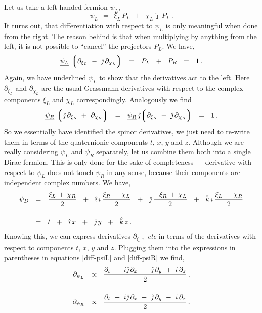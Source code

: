 \documentclass[epsfig,12pt]{article}
\newcommand{\p}{\partial}
\newcommand{\lgr}{\left\lgroup}
\newcommand{\rgr}{\right\rgroup}
\newcommand{\ii}{\hat\imath}
\newcommand{\jj}{\hat\jmath}
\newcommand{\kk}{\hat k}
\begin{document}
	Let us take a left-handed fermion $ \psi_L $,
\begin{equation}
	\psi_L	~~=~~	\xi_L\,P_L  ~~+~~  \chi_L\,\jj\,P_L\,.
\end{equation}
	It turns out, that differentiation with respect to $ \psi_L $ is only
	meaningful when done from the right.
	The reason behind is that when multiplying by anything from the left, it is 
	not possible to ``cancel'' the projectors $ P_L $.
	We have,
\begin{equation}
\label{diff-psiL}
	\underline{\psi_L}\, \lgr \p_{\xi_L} ~-~ \jj\, \p_{\chi_L} \rgr
	~~=~~
	P_L  ~~+~~  P_R
	~~=~~
	1\,.
\end{equation}
	Again, we have underlined $ \psi_L $ to show that the derivatives act to the left.
	Here $ \p_{\xi_L} $ and $ \p_{\chi_L} $ are the usual Grassmann derivatives with respect to
	the complex components $ \xi_L $ and $ \chi_L $ correspondingly.
	Analogously we find
\begin{equation}
\label{diff-psiR}
	\underline{\psi_R}\, \lgr \jj\, \p_{\xi_R} ~+~ \p_{\chi_R} \rgr	~~=~~
	\underline{\psi_R}\, \jj\! \lgr \p_{\xi_R} ~-~ \jj\, \p_{\chi_R} \rgr	~~=~~
	1\,.
\end{equation}
	So we essentially have identified the spinor derivatives, we just need to re-write them
	in terms of the quaternionic components $ t $, $ x $, $ y $ and $ z $.
	Although we are really considering $ \psi_L $ and $ \psi_R $ separately,
	let us combine them both into a single Dirac fermion.
	This is only done for the sake of completeness --- derivative with respect to $ \psi_L $
	does not touch $ \psi_R $ in any sense, 
	because their components are independent complex numbers.
	We have,
\begin{align}
%
\notag
	\psi_D	& ~~=~~
	\frac{ \xi_L \,+\, \chi_R } 2  ~~+~~
	\ii\, i\,\frac{\xi_R \,+\, \chi_L} 2  ~~+~~
	\jj\, \frac{-\xi_R \,+\, \chi_L} 2  ~~+~~
	\kk\, i\,\frac{\xi_L \,-\, \chi_R} 2
	\\[4mm]
%
\label{psiD-as-quat}
	& ~~=~~
	t  ~~+~~  \ii\, x  ~~+~~  \jj\, y  ~~+~~  \kk\, z\,.
\end{align}
	Knowing this, we can express derivatives $ \p_{\xi_L}, $ \emph{etc} in terms
	of the derivatives with respect to components $ t $, $ x $, $ y $ and $ z $.
	Plugging them into the expressions in parentheses in equations
	\eqref{diff-psiL} and \eqref{diff-psiR} we find,
\begin{align}
%
\notag
	\p_{\psi_L}	& ~~\propto~~
	\frac{\p_t ~-~ i\jj\,\p_x ~-~ \jj\,\p_y ~+~ i\,\p_z} 2\,,
	\\[5mm]
%
\label{prelim-psi-der}
	\p_{\psi_R}	& ~~\propto~~
	\frac{\p_t ~+~ i\jj\,\p_x ~-~ \jj\,\p_y ~-~ i\,\p_z} 2\,.
\end{align}
\end{document}
